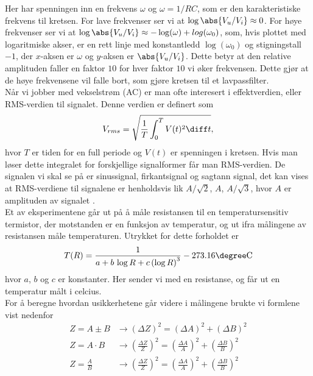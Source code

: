 \documentclass[%
 reprint,
nofootinbib,
aps,
]{revtex4-1}
\begin{document}
Her har spenningen inn en frekvens $\omega$ og $\omega = 1/RC$, som er den karakteristiske frekvens til kretsen. For lave frekvenser ser vi at $\log\abs{V_u/V_i}\approx 0$. For høye frekvenser ser vi at $\log\abs{V_u/V_i}\approx -\log(\omega) + log(\omega_0)$, som, hvis plottet med logaritmiske akser, er en rett linje med konstantledd $\log(\omega_0)$ og stigningstall $-1$, der $x$-aksen er $\omega$ og $y$-aksen er $\abs{V_u/V_i}$. Dette betyr at den relative amplituden faller en faktor $10$ for hver faktor $10$ vi øker frekvensen. Dette gjør at de høye frekvensene vil falle bort, som gjøre kretsen til et lavpassfilter.
\\
Når vi jobber med vekselstrøm (AC) er man ofte interesert i effektverdien, eller RMS-verdien til signalet. Denne verdien er definert som
\begin{equation}
  V_{rms} = \sqrt{\frac{1}{T} \int_0^T V(t)^2 \diff t} \label{rms},
\end{equation}hvor $T$ er tiden for en full periode og $V(t)$ er spenningen i kretsen. Hvis man løser dette integralet for forskjellige signalformer får man RMS-verdien. De signalen vi skal se på er sinussignal, firkantsignal og sagtann signal, det kan vises at RMS-verdiene til signalene er henholdsvis lik $A/\sqrt{2}$, $A$, $A/\sqrt{3}$, hvor $A$ er amplituden av signalet \cite{rms_wiki}.
\\
Et av eksperimentene går ut på å måle resistansen til en temperatursensitiv termistor, der motstanden er en funksjon av temperatur, og ut ifra målingene av resistansen måle temperaturen. Utrykket for dette forholdet er
\begin{equation}
  T(R) = \frac{1}{a+b\, \log R + c \left(\log R\right)^3} - 273.16 \degree\text{C} \label{calc_temp}
\end{equation}hvor $a$, $b$ og $c$ er konstanter. Her sender vi med en resistanse, og får ut en temperatur målt i celcius. \\
For å beregne hvordan usikkerhetene går videre i målingene brukte vi formlene \cite{squires} vist nedenfor
\begin{align*}
  Z = A \pm B &\rightarrow \left(\Delta Z\right)^2 =  \left(\Delta A\right)^2 +\left(\Delta B\right)^2 \\
  Z = A\cdot B &\rightarrow \left(\frac{\Delta Z}{Z}\right)^2 =  \left(\frac{\Delta A}{A}\right)^2 +\left(\frac{\Delta B}{B}\right)^2 \\
  Z = \frac{A}{B} &\rightarrow \left(\frac{\Delta Z}{Z}\right)^2 =  \left(\frac{\Delta A}{A}\right)^2 +\left(\frac{\Delta B}{B}\right)^2
\end{align*}
\end{document}
